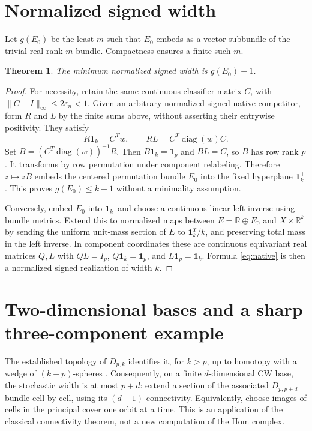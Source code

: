\documentclass[11pt]{article}
\newtheorem{theorem}{Theorem}
\theoremstyle{remark}\newtheorem{remark}[theorem]{Remark}
\newcommand{\R}{\mathbb R}
\newcommand{\one}{\mathbf 1}
\newcommand{\diag}{\operatorname{diag}}
\newcommand{\eps}{\varepsilon}
\begin{document}
\section{Normalized signed width}
Let $g(E_0)$ be the least $m$ such that $E_0$ embeds as a vector subbundle of the trivial real rank-$m$ bundle. Compactness ensures a finite such $m$.
\begin{theorem}\label{thm:signed}
The minimum normalized signed width is $g(E_0)+1$.
\end{theorem}
\begin{proof}
For necessity, retain the same continuous classifier matrix $C$, with $\|C-I\|_\infty\leq2\eps_n<1$. Given an arbitrary normalized signed native competitor, form $R$ and $L$ by the finite sums above, without asserting their entrywise positivity. They satisfy
\[
 R\one_k=C^Tw,\qquad RL=C^T\diag(w)C.
\]
Set $B=(C^T\diag(w))^{-1}R$. Then $B\one_k=\one_p$ and $BL=C$, so $B$ has row rank $p$. It transforms by row permutation under component relabeling. Therefore $z\mapsto zB$ embeds the centered permutation bundle $E_0$ into the fixed hyperplane $\one_k^\perp$. This proves $g(E_0)\leq k-1$ without a minimality assumption.

Conversely, embed $E_0$ into $\one_k^\perp$ and choose a continuous linear left inverse using bundle metrics. Extend this to normalized maps between $E=\R\oplus E_0$ and $X\times\R^k$ by sending the uniform unit-mass section of $E$ to $\one_k^T/k$, and preserving total mass in the left inverse. In component coordinates these are continuous equivariant real matrices $Q,L$ with $QL=I_p$, $Q\one_k=\one_p$, and $L\one_p=\one_k$. Formula \eqref{eq:native} is then a normalized signed realization of width $k$.
\end{proof}

\section{Two-dimensional bases and a sharp three-component example}
The established topology of $D_{p,k}$ identifies it, for $k>p$, up to homotopy with a wedge of $(k-p)$-spheres \cite{AGH,BK}. Consequently, on a finite $d$-dimensional CW base, the stochastic width is at most $p+d$: extend a section of the associated $D_{p,p+d}$ bundle cell by cell, using its $(d-1)$-connectivity. Equivalently, choose images of cells in the principal cover one orbit at a time. This is an application of the classical connectivity theorem, not a new computation of the Hom complex.
\end{document}
